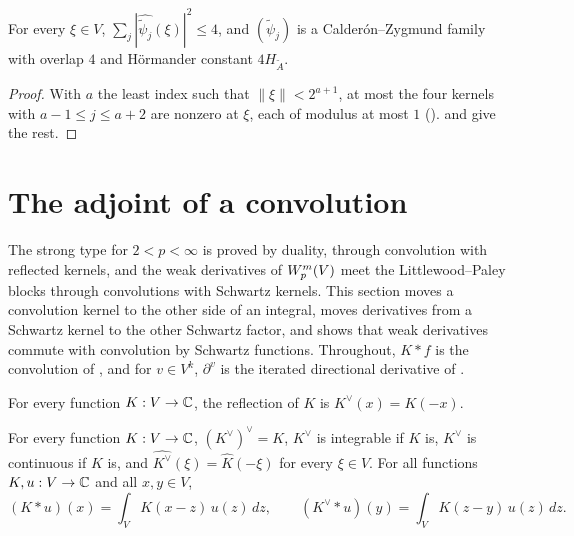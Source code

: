 \begin{theorem}
\label{thm:cz-family-psi-dual}
\leanok
{}
For every $\xi \in V$, $\sum_j |\widehat{\tilde\psi_j}(\xi)|^2 \leq 4$, and $(\tilde\psi_j)$ is a
Calder\'on--Zygmund family with overlap $4$ and H\"ormander constant $4 H_{\tilde A}$.
\end{theorem}

\begin{proof}
\leanok
With $a$ the least index such that $\|\xi\| < 2^{a+1}$, at most the four kernels with
$a - 1 \leq j \leq a + 2$ are nonzero at $\xi$, each of modulus at most $1$
().  and 
give the rest.
\end{proof}

\section{The adjoint of a convolution}
\label{sec:convolution-adjoint}

The strong type for $2 < p < \infty$ is proved by duality, through convolution with
reflected kernels, and the weak derivatives of
$W^{m}_{p}(V)$ meet the Littlewood--Paley blocks through convolutions with Schwartz kernels.
This section moves a convolution kernel to the other side of an integral, moves derivatives
from a Schwartz kernel to the other Schwartz factor, and shows that weak derivatives commute
with convolution by Schwartz functions. Throughout, $K * f$ is the convolution of
, and for $v \in V^k$, $\partial^v$ is the iterated directional derivative of
.

\begin{definition}[Reflection]
\label{def:reflect}
\leanok
For every function $K : V \to \mathbb{C}$, the reflection of $K$ is $K^\vee(x) = K(-x)$.
\end{definition}

\begin{lemma}
\label{lem:reflect-basic}
\leanok
{}
For every function $K : V \to \mathbb{C}$, $(K^\vee)^\vee = K$, $K^\vee$ is integrable if $K$ is,
$K^\vee$ is continuous if $K$ is, and $\widehat{K^\vee}(\xi) = \widehat K(-\xi)$ for every
$\xi \in V$. For all functions $K, u : V \to \mathbb{C}$ and all $x, y \in V$,
\[
  (K * u)(x) = \int_V K(x - z) \, u(z) \, dz , \qquad
  (K^\vee * u)(y) = \int_V K(z - y) \, u(z) \, dz .
\]
\end{lemma}


